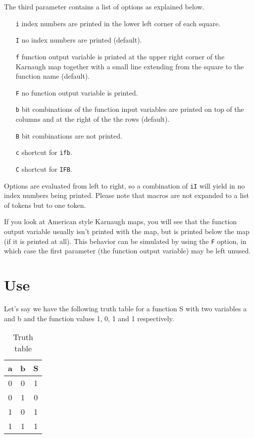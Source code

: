 \documentclass[a4paper,10pt]{ltxdoc}
\begin{document}
The third parameter contains a list of options as explained below.
\begin{itemize}
    \itemsep0pt
    \item[\texttt{i}] index numbers are printed in the lower left corner of
                      each square.
    \item[\texttt{I}] no index numbers are printed (default).
    \item[\texttt{f}] function output variable is printed at the upper right
                      corner of the Karnaugh map together with a small line
                      extending from the square to the function name (default).
    \item[\texttt{F}] no function output variable is printed.
    \item[\texttt{b}] bit combinations of the function input variables are
                      printed on top of the columns and at the right of the the
                      rows (default).
    \item[\texttt{B}] bit combinations are not printed.
    \item[\texttt{c}] shortcut for \texttt{ifb}.
    \item[\texttt{C}] shortcut for \texttt{IFB}.
\end{itemize}

Options are evaluated from left to right, so a combination of \texttt{iI} will
yield in no index numbers being printed. Please note that macros are not
expanded to a list of tokens but to one token.\newline

If you look at American style Karnaugh maps, you will see that the function
output variable usually isn't printed with the map, but is printed below the
map (if it is printed at all). This behavior can be simulated by using the
\texttt{F} option, in which case the first parameter (the function output
variable) may be left unused.


\section{Use}
\label{sec:use}
Let's say we have the following truth table for a function S with two variables
a and b and the function values 1, 0, 1 and 1 respectively.

\begin{table}[H]
\centering
\caption{Truth table}
\begin{tabular}{cc|c}
\hline 
a & b & S \\ \hline 
0 & 0 & 1 \\ 
0 & 1 & 0 \\ 
1 & 0 & 1 \\ 
1 & 1 & 1 \\ 
\hline 
\end{tabular} 
\end{table}
\end{document}

